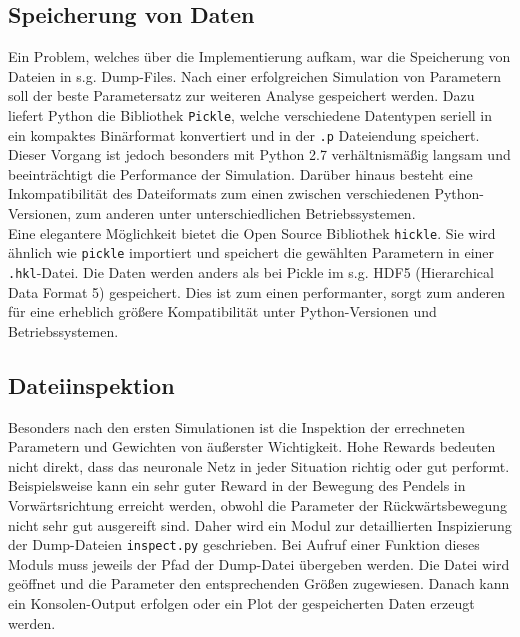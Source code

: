 	\subsection{Speicherung von Daten}
		Ein Problem, welches über die Implementierung aufkam, war die Speicherung von Dateien in s.g. Dump-Files. Nach einer erfolgreichen Simulation von Parametern soll der beste Parametersatz zur weiteren Analyse gespeichert werden. Dazu liefert Python die Bibliothek \texttt{Pickle}, welche verschiedene Datentypen seriell in ein kompaktes Binärformat konvertiert und in der \texttt{.p} Dateiendung speichert. Dieser Vorgang ist jedoch besonders mit Python 2.7 verhältnismäßig langsam und beeinträchtigt die Performance der Simulation. Darüber hinaus besteht eine Inkompatibilität des Dateiformats zum einen zwischen verschiedenen Python-Versionen, zum anderen unter unterschiedlichen Betriebssystemen.\\
		Eine elegantere Möglichkeit bietet die Open Source Bibliothek \texttt{hickle}. Sie wird ähnlich wie \texttt{pickle} importiert und speichert die gewählten Parametern in einer \texttt{.hkl}-Datei. Die Daten werden anders als bei Pickle im s.g. HDF5 (Hierarchical Data Format 5) \cite{hdf5} gespeichert. Dies ist zum einen performanter, sorgt zum anderen für eine erheblich größere Kompatibilität unter Python-Versionen und Betriebssystemen.
	\subsection{Dateiinspektion}
		Besonders nach den ersten Simulationen ist die Inspektion der errechneten Parametern und Gewichten von äußerster Wichtigkeit. Hohe Rewards bedeuten nicht direkt, dass das neuronale Netz in jeder Situation richtig oder gut performt. Beispielsweise kann ein sehr guter Reward in der Bewegung des Pendels in Vorwärtsrichtung erreicht werden, obwohl die Parameter der Rückwärtsbewegung nicht sehr gut ausgereift sind. Daher wird ein Modul zur detaillierten Inspizierung der Dump-Dateien \texttt{inspect.py} geschrieben. Bei Aufruf einer Funktion dieses Moduls muss jeweils der Pfad der Dump-Datei übergeben werden. Die Datei wird geöffnet und die Parameter den entsprechenden Größen zugewiesen. Danach kann ein Konsolen-Output erfolgen oder ein Plot der gespeicherten Daten erzeugt werden.


